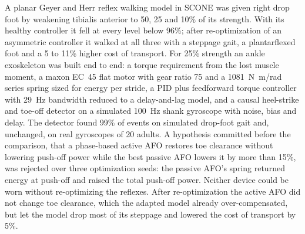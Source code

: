 A planar Geyer and Herr reflex walking model in SCONE was given right drop foot by weakening tibialis anterior to 50, 25 and 10\% of its strength. With its healthy controller it fell at every level below 96\%; after re-optimization of an asymmetric controller it walked at all three with a steppage gait, a plantarflexed foot and a 5 to 11\% higher cost of transport. For 25\% strength an ankle exoskeleton was built end to end: a torque requirement from the lost muscle moment, a maxon EC~45 flat motor with gear ratio 75 and a \SI{1081}{N.m/rad} series spring sized for energy per stride, a PID plus feedforward torque controller with \SI{29}{Hz} bandwidth reduced to a delay-and-lag model, and a causal heel-strike and toe-off detector on a simulated \SI{100}{Hz} shank gyroscope with noise, bias and delay. The detector found 99\% of events on simulated drop-foot gait and, unchanged, on real gyroscopes of 20 adults. A hypothesis committed before the comparison, that a phase-based active AFO restores toe clearance without lowering push-off power while the best passive AFO lowers it by more than 15\%, was rejected over three optimization seeds: the passive AFO's spring returned energy at push-off and raised the total push-off power. Neither device could be worn without re-optimizing the reflexes. After re-optimization the active AFO did not change toe clearance, which the adapted model already over-compensated, but let the model drop most of its steppage and lowered the cost of transport by 5\%.
